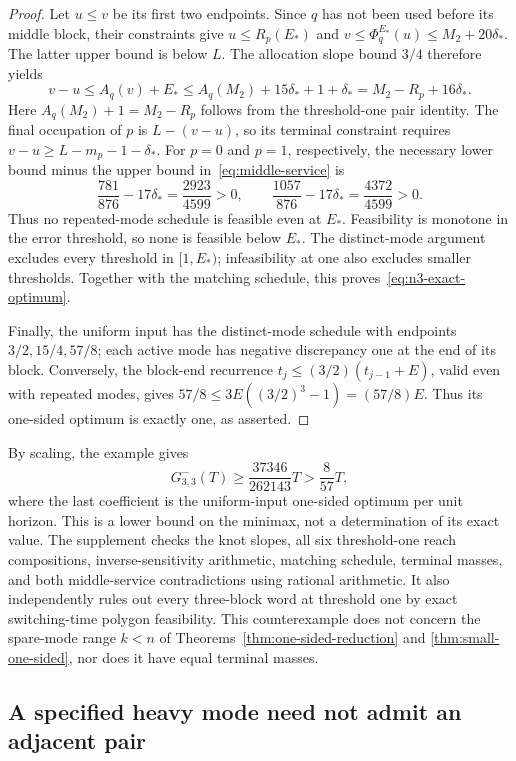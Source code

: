 \begin{proof}
Let $u\le v$ be its first two endpoints. Since $q$ has not been used
before its middle block, their constraints give
$u\le R_p(E_*)$ and
$v\le\Phi_q^{E_*}(u)\le M_2+20\delta_*$.
The latter upper bound is below $L$. The allocation slope bound $3/4$
therefore yields
\begin{equation}\label{eq:middle-service}
 v-u\le A_q(v)+E_*
 \le A_q(M_2)+15\delta_*+1+\delta_*
 =M_2-R_p+16\delta_*.
\end{equation}
Here $A_q(M_2)+1=M_2-R_p$ follows from the threshold-one pair identity.
The final occupation of $p$ is $L-(v-u)$, so its terminal constraint
requires $v-u\ge L-m_p-1-\delta_*$. For $p=0$ and $p=1$,
respectively, the necessary lower bound minus the upper bound
in~\eqref{eq:middle-service} is
\[
 \frac{781}{876}-17\delta_* =\frac{2923}{4599}>0,
 \qquad
 \frac{1057}{876}-17\delta_* =\frac{4372}{4599}>0.
\]
Thus no repeated-mode schedule is feasible even at $E_*$. Feasibility
is monotone in the error threshold, so none is feasible below $E_*$.
The distinct-mode argument excludes every threshold in $[1,E_*)$;
infeasibility at one also excludes smaller thresholds. Together with the
matching schedule, this proves~\eqref{eq:n3-exact-optimum}.

Finally, the uniform input has the distinct-mode schedule with endpoints
$3/2,15/4,57/8$; each active mode has negative discrepancy one at the end
of its block. Conversely, the block-end recurrence
$t_j\le(3/2)(t_{j-1}+E)$, valid even with repeated modes, gives
$57/8\le3E((3/2)^3-1)=(57/8)E$. Thus its one-sided optimum is exactly
one, as asserted.
\end{proof}

By scaling, the example gives
\[
 G^-_{3,3}(T)\ge\frac{37346}{262143}T>\frac8{57}T,
\]
where the last coefficient is the uniform-input one-sided optimum per unit
horizon. This is a lower bound on the minimax, not a determination of its
exact value. The supplement checks the knot slopes, all six threshold-one
reach compositions, inverse-sensitivity arithmetic, matching schedule,
terminal masses, and both middle-service contradictions using rational
arithmetic. It also independently rules out every three-block word at
threshold one by exact switching-time polygon feasibility. This counterexample
does not concern the spare-mode range
$k<n$ of Theorems~\ref{thm:one-sided-reduction} and
\ref{thm:small-one-sided}, nor does it have equal terminal masses.

\subsection{A specified heavy mode need not admit an adjacent pair}

